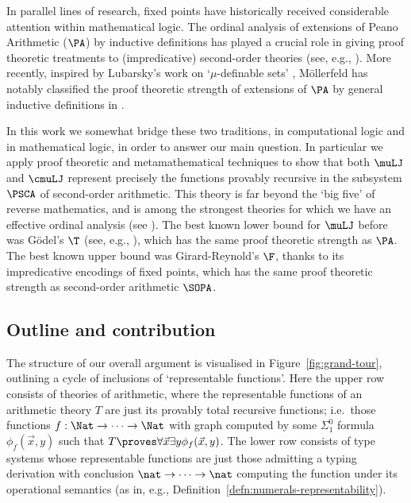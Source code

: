 
In parallel lines of research, fixed points have historically received considerable attention within mathematical logic.
The ordinal analysis of extensions of Peano Arithmetic ($\PA$) by inductive definitions has played a crucial role in giving proof theoretic treatments to (impredicative) second-order theories (see, e.g., \cite{sep-proof-theory}).
More recently, inspired by Lubarsky's work on `$\mu$-definable sets' \cite{Lubarsky93}, M\"ollerfeld has notably classified the proof theoretic strength of extensions of $\PA$ by general inductive definitions in \cite{Moellerfeld02:phd-thesis}.

In this work we somewhat bridge these two traditions, in computational logic and in mathematical logic, in order to answer our main question.
In particular we apply proof theoretic and metamathematical techniques to show that both $\muLJ$ and $\cmuLJ$ represent precisely the functions provably recursive in the subsystem $\PSCA$ of second-order arithmetic.
This theory is far beyond the `big five' of reverse mathematics, and is among the strongest theories for which we have an effective ordinal analysis (see \cite{Rathjen95:recent-advances}). 
The best known lower bound for $\muLJ$ before was G\"odel's $\T$ (see, e.g., \cite{Clairambault09}), which has the same proof theoretic strength as $\PA$. 
The best known upper bound was Girard-Reynold's $\F$, thanks to its impredicative encodings of fixed points, which has the same proof theoretic strength as second-order arithmetic $\SOPA$.



\subsection{Outline and contribution}
The structure of our overall argument is visualised in Figure~\ref{fig:grand-tour}, outlining a cycle of inclusions of `representable functions'.
Here the upper row consists of theories of arithmetic, where the representable functions of an arithmetic theory $T$ are just its provably total recursive functions; i.e.\ those functions $ f : \Nat \to \cdots \to \Nat$ with graph computed by some $\Sigma^0_1$ formula $\phi_f(\vec x, y)$ such that $T \proves \forall \vec x \exists y \phi_f (\vec x,y) $.
The lower row consists of type systems whose representable functions are just those admitting a typing derivation with conclusion $\nat \to \cdots \to \nat$ computing the function under its operational semantics (as in, e.g., Definition~\ref{defn:numerals-representability}). 


